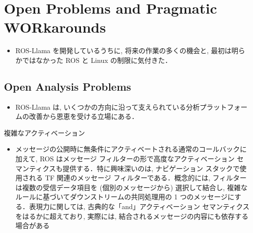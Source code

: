 
\section{Open Problems and Pragmatic WORkarounds}
\label{sec: open problems and pragmatic workarounds}

\begin{frame}{}
    \begin{itemize}
        \item ROS-Llama を開発しているうちに, 将来の作業の多くの機会と, 最初は明らかではなかった ROS と Linux の制限に気付きた．
    \end{itemize}
\end{frame}


\subsection{Open Analysis Problems}
\label{ssec: Open Analysis Problems}

\begin{frame}{}
    \begin{itemize}
        \item ROS-Llama は, いくつかの方向に沿って支えられている分析プラットフォームの改善から恩恵を受ける立場にある．
    \end{itemize}
\end{frame}

\begin{frame}{複雑なアクティベーション}
    \begin{itemize}
        \item メッセージの公開時に無条件にアクティベートされる通常のコールバックに加えて, ROS はメッセージ フィルターの形で高度なアクティベーション セマンティクスも提供する．特に興味深いのは, ナビゲーション スタックで使用される TF 関連のメッセージ フィルターである．概念的には, フィルターは複数の受信データ項目を (個別のメッセージから) 選択して結合し, 複雑なルールに基づいてダウンストリームの共同処理用の 1 つのメッセージにする．表現力に関しては, 古典的な「and」アクティベーション セマンティクスをはるかに超えており, 実際には, 結合されるメッセージの内容にも依存する場合がある
    \end{itemize}
\end{frame}

